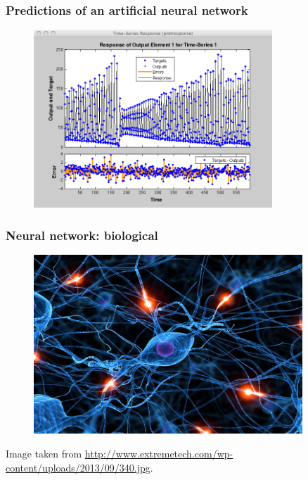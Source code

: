 \begin{frame}
	\frametitle{Predictions of an artificial neural network}
	\begin{figure}[!h]
		\centering
		\includegraphics[width=0.8\textwidth]{img/santafe-matlab.png}
	\end{figure}
\end{frame}

\begin{frame}
	\frametitle{Neural network: biological}
	\begin{figure}[!h]
		\centering
		\includegraphics[width=0.9\textwidth]{img/neural-network-cool.jpg}
	\end{figure}
	\tiny{Image taken from \url{http://www.extremetech.com/wp-content/uploads/2013/09/340.jpg}}.
\end{frame}

